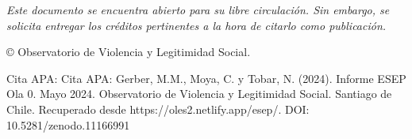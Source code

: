 \null\vfill
\begin{flushleft}
\thispagestyle{empty}
\textit{Este documento se encuentra abierto para su libre circulación. Sin embargo, se solicita entregar los créditos pertinentes a la hora de citarlo como publicación.}

© Observatorio de Violencia y Legitimidad Social. 

\noindent Cita APA: Cita APA: Gerber, M.M., Moya, C. y Tobar, N. (2024). Informe ESEP Ola 0. Mayo 2024. Observatorio de Violencia y Legitimidad Social. Santiago de Chile. Recuperado desde https://oles2.netlify.app/esep/. DOI: 10.5281/zenodo.11166991

\end{flushleft}

